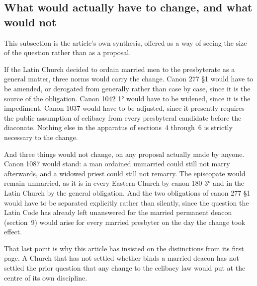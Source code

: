 \subsection{What would actually have to change, and what would not}

This subsection is the article's own synthesis, offered as a way of seeing the size of the question rather than as a proposal.

If the Latin Church decided to ordain married men to the presbyterate as a general matter, three norms would carry the change. Canon 277 §1 would have to be amended, or derogated from generally rather than case by case, since it is the source of the obligation. Canon 1042 1° would have to be widened, since it is the impediment. Canon 1037 would have to be adjusted, since it presently requires the public assumption of celibacy from every presbyteral candidate before the diaconate. Nothing else in the apparatus of sections~4 through~6 is strictly necessary to the change.

And three things would not change, on any proposal actually made by anyone. Canon 1087 would stand: a man ordained unmarried could still not marry afterwards, and a widowed priest could still not remarry. The episcopate would remain unmarried, as it is in every Eastern Church by canon 180 3° and in the Latin Church by the general obligation. And the two obligations of canon 277 §1 would have to be separated explicitly rather than silently, since the question the Latin Code has already left unanswered for the married permanent deacon (section~9) would arise for every married presbyter on the day the change took effect.

That last point is why this article has insisted on the distinctions from its first page. A Church that has not settled whether  binds a married deacon has not settled the prior question that any change to the celibacy law would put at the centre of its own discipline.
